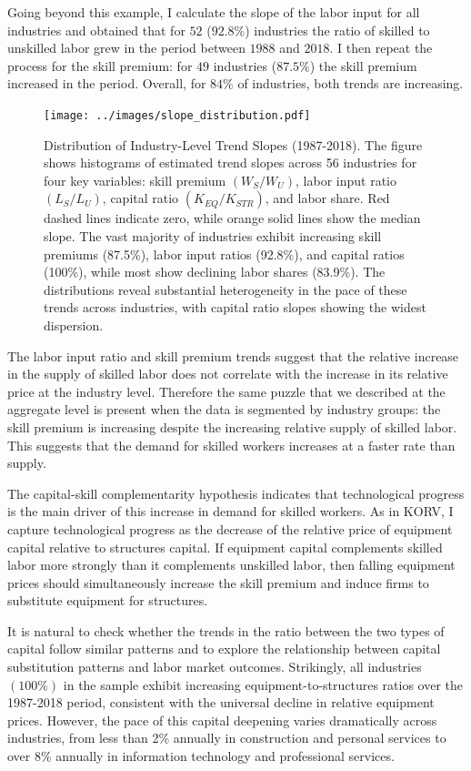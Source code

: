 \documentclass[12pt]{article}
\begin{document}
Going beyond this example, I calculate the slope of the labor input for all industries and obtained that for $52$ ($92.8\%$) industries the ratio of skilled to unskilled labor grew in the period between $1988$ and $2018$. I then repeat the process for the skill premium: for $49$ industries ($87.5\%$) the skill premium increased in the period. Overall, for $84\%$ of industries, both trends are increasing.

\begin{figure}[H]
\centering
\texttt{[image: ../images/slope\_distribution.pdf]}
\caption{\label{fig:slope_distribution} Distribution of Industry-Level Trend Slopes (1987-2018). The figure shows histograms of estimated trend slopes across 56 industries for four key variables: skill premium $(W_S/W_U)$, labor input ratio $(L_S/L_U)$, capital ratio $(K_{EQ}/K_{STR})$, and labor share. Red dashed lines indicate zero, while orange solid lines show the median slope. The vast majority of industries exhibit increasing skill premiums (87.5\%), labor input ratios (92.8\%), and capital ratios (100\%), while most show declining labor shares (83.9\%). The distributions reveal substantial heterogeneity in the pace of these trends across industries, with capital ratio slopes showing the widest dispersion.}
\end{figure}

The labor input ratio and skill premium trends suggest that the relative increase in the supply of skilled labor does not correlate with the increase in its relative price at the industry level. Therefore the same puzzle that we described at the aggregate level is present when the data is segmented by industry groups: the skill premium is increasing despite the increasing relative supply of skilled labor. This suggests that the demand for skilled workers increases at a faster rate than supply.

The capital-skill complementarity hypothesis indicates that technological progress is the main driver of this increase in demand for skilled workers. As in KORV, I capture technological progress as the decrease of the relative price of equipment capital relative to structures capital. If equipment capital complements skilled labor more strongly than it complements unskilled labor, then falling equipment prices should simultaneously increase the skill premium and induce firms to substitute equipment for structures.

It is natural to check whether the trends in the ratio between the two types of capital follow similar patterns and to explore the relationship between capital substitution patterns and labor market outcomes. Strikingly, all industries $(100\%)$ in the sample exhibit increasing equipment-to-structures ratios over the 1987-2018 period, consistent with the universal decline in relative equipment prices. However, the pace of this capital deepening varies dramatically across industries, from less than 2\% annually in construction and personal services to over 8\% annually in information technology and professional services.
\end{document}
